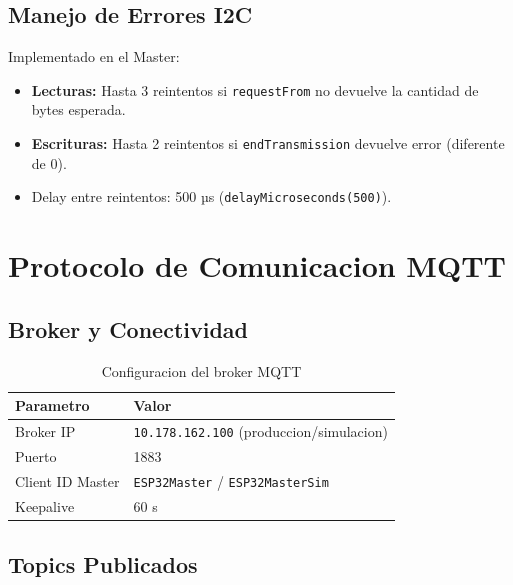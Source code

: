 \subsection{Manejo de Errores I2C}

Implementado en el Master:
\begin{itemize}
    \item \textbf{Lecturas:} Hasta 3 reintentos si \texttt{requestFrom} no devuelve la cantidad de bytes esperada.
    \item \textbf{Escrituras:} Hasta 2 reintentos si \texttt{endTransmission} devuelve error (diferente de 0).
    \item Delay entre reintentos: 500 µs (\texttt{delayMicroseconds(500)}).
\end{itemize}


\section{Protocolo de Comunicacion MQTT}

\subsection{Broker y Conectividad}

\begin{table}[H]
\centering
\small
\caption{Configuracion del broker MQTT}
\label{tab:mqtt-broker}
\begin{tabularx}{0.7\textwidth}{@{}lX@{}}
\toprule
\textbf{Parametro} & \textbf{Valor} \\
\midrule
Broker IP & \texttt{10.178.162.100} (produccion/simulacion) \\
Puerto & 1883 \\
Client ID Master & \texttt{ESP32Master} / \texttt{ESP32MasterSim} \\
Keepalive & 60 s \\
\bottomrule
\end{tabularx}
\end{table}

\subsection{Topics Publicados}

